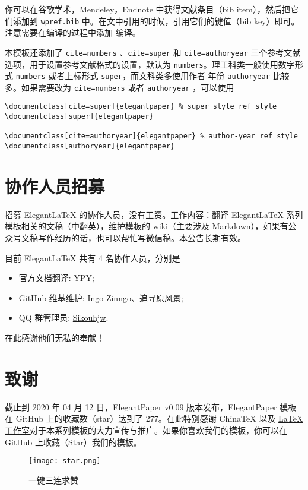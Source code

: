 \documentclass[lang=cn,11pt,a4paper,cite=authoryear]{elegantpaper}
\begin{document}
你可以在谷歌学术，Mendeley，Endnote 中获得文献条目（bib item），然后把它们添加到 \lstinline{wpref.bib} 中。在文中引用的时候，引用它们的键值（bib key）即可。注意需要在编译的过程中添加  编译。

本模板还添加了 \lstinline{cite=numbers} 、\lstinline{cite=super} 和 \lstinline{cite=authoryear}  三个参考文献选项，用于设置参考文献格式的设置，默认为 \lstinline{numbers}。理工科类一般使用数字形式 \lstinline{numbers} 或者上标形式 \lstinline{super}，而文科类多使用作者-年份 \lstinline{authoryear} 比较多。如果需要改为 \lstinline{cite=numbers}  或者  \lstinline{authoryear} ，可以使用
\begin{lstlisting}
\documentclass[cite=super]{elegantpaper} % super style ref style
\documentclass[super]{elegantpaper}

\documentclass[cite=authoryear]{elegantpaper} % author-year ref style
\documentclass[authoryear]{elegantpaper}
\end{lstlisting}


\section{协作人员招募}
招募 Elegant\LaTeX{} 的协作人员，没有工资。工作内容：翻译 Elegant\LaTeX{} 系列模板相关的文稿（中翻英），维护模板的 wiki（主要涉及 Markdown），如果有公众号文稿写作经历的话，也可以帮忙写微信稿。本公告长期有效。

目前 ElegantLaTeX 共有 4 名协作人员，分别是
\begin{itemize}
  \item 官方文档翻译: \href{https://github.com/peggy2006xzyz}{YPY};
  \item GitHub 维基维护: \href{https://github.com/izinngo}{Ingo Zinngo}、\href{https://github.com/xiaohao890809}{追寻原风景};
  \item QQ 群管理员: \href{https://github.com/sikouhjw}{Sikouhjw}.
\end{itemize}

在此感谢他们无私的奉献！


\section{致谢}
截止到 2020 年 04 月 12 日，ElegantPaper v0.09 版本发布，ElegantPaper 模板在 GitHub 上的收藏数（star）达到了 277。在此特别感谢 China\TeX{} 以及 \href{http://www.latexstudio.net/}{\LaTeX{} 工作室}对于本系列模板的大力宣传与推广。如果你喜欢我们的模板，你可以在 GitHub 上收藏（Star）我们的模板。
\begin{figure}[htbp]
  \centering
  \texttt{[image: star.png]}
  \caption{一键三连求赞}
\end{figure}
\end{document}
